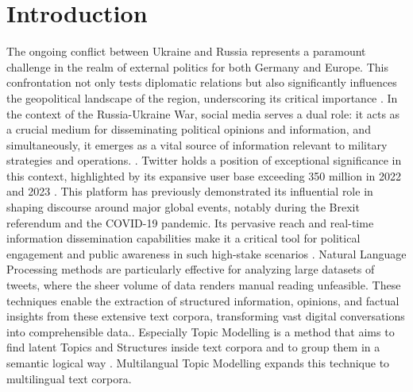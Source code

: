 \documentclass[
    11pt,
    a4paper,
    egregdoesnotlikesansseriftitles,
    toc=chapterentrywithdots,
    oneside,openright,
    titlepage,
    parskip=half,
    headings=normal,  %
    listof=totoc,
    bibliography=totoc,
    index=totoc,
    captions=tableheading,  %
    chapterprefix,
    listof=flat,
    final
]{scrbook}
\begin{document}
\setcounter{secnumdepth}{3}  %
\setcounter{tocdepth}{2}  %

\frontmatter
{} 




\tableofcontents


{\let\clearpage\relax \chapter{Introduction}}
The ongoing conflict between Ukraine and Russia represents a paramount challenge in the realm of external politics for both Germany and Europe. This confrontation not only tests diplomatic relations but also significantly influences the geopolitical landscape of the region, underscoring its critical importance \cite{Zeitenwende}. In the context of the Russia-Ukraine War, social media serves a dual role: it acts as a crucial medium for disseminating political opinions and information, and simultaneously, it emerges as a vital source of information relevant to military strategies and operations. \cite{SocialMediaUkraine}.
Twitter holds a position of exceptional significance in this context, highlighted by its expansive user base exceeding 350 million in 2022 and 2023 \cite{TwitterUsers}. This platform has previously demonstrated its influential role in shaping discourse around major global events, notably during the Brexit referendum and the COVID-19  pandemic. Its pervasive reach and real-time information dissemination capabilities make it a critical tool for political engagement and public awareness in such high-stake scenarios \cite{ TwitterBrexit, TwitterBrexit2, TwitterCovid, SocialNetworking}.
Natural Language Processing methods are particularly effective for analyzing large datasets of tweets, where the sheer volume of data renders manual reading unfeasible. These techniques enable the extraction of structured information, opinions, and factual insights from these extensive text corpora, transforming vast digital conversations into comprehensible data.\cite{Fraunhofer}.
Especially Topic Modelling is a method that aims to find latent Topics and Structures inside text corpora and to group them in a semantic logical way \cite{TopicModelling}.
Multilangual Topic Modelling expands this technique to multilingual text corpora.
\end{document}

